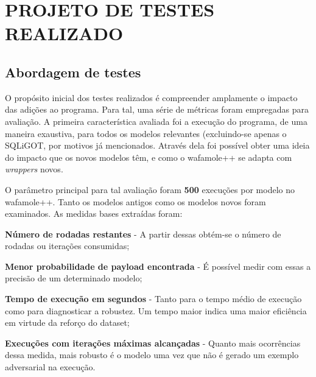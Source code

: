 \chapter{PROJETO DE TESTES REALIZADO}
\label{chp:capitulo5}

\section{Abordagem de testes}
O propósito inicial dos testes realizados é compreender amplamente o impacto das adições ao programa. Para tal, uma série de métricas foram empregadas para avaliação. A primeira característica avaliada foi a execução do programa, de uma maneira exaustiva, para todos os modelos relevantes (excluindo-se apenas o SQLiGOT, por motivos já mencionados. Através dela foi possível obter uma ideia do impacto que os novos modelos têm, e como o wafamole++ se adapta com \textit{wrappers} novos.

O parâmetro principal para tal avaliação foram \textbf{500} execuções por modelo no wafamole++. Tanto os modelos antigos como os modelos novos foram examinados. As medidas bases extraídas foram:
\begin{alineas}
\item \textbf{Número de rodadas restantes} - A partir dessas obtém-se o número de rodadas ou iterações consumidas;
\item \textbf{Menor probabilidade de payload encontrada} - É possível medir com essas a precisão de um determinado modelo;
\item \textbf{Tempo de execução em segundos} - Tanto para o tempo médio de execução como para diagnosticar a robustez. Um tempo maior indica uma maior eficiência em virtude da reforço do dataset;
\item \textbf{Execuções com iterações máximas alcançadas} - Quanto mais ocorrências dessa medida, mais robusto é o modelo uma vez que não é gerado um exemplo adversarial na execução.
\end{alineas}

